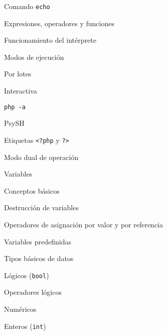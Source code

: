 \begin{longenum}
\begin{longenum}
\begin{longenum}
            \begin{longenum}
                \item Comando \texttt{echo}
            \end{longenum}
            \item Expresiones, operadores y funciones
        \end{longenum}
        \item Funcionamiento del intérprete
        \begin{longenum}
            \item Modos de ejecución
            \begin{longenum}
                \item Por lotes
                \item Interactiva
                \begin{longenum}
                    \item \texttt{php -a}
                    \item PsySH
                \end{longenum}
            \end{longenum}
            \item Etiquetas \texttt{<?php} y \texttt{?>}
            \item Modo dual de operación
        \end{longenum}
        \item Variables
        \begin{longenum}
            \item Conceptos básicos
            \item Destrucción de variables
            \item Operadores de asignación por valor y por referencia
            \item Variables predefinidas
        \end{longenum}
        \item Tipos básicos de datos
        \begin{longenum}
            \item Lógicos (\texttt{bool})
            \begin{longenum}
                \item Operadores lógicos
            \end{longenum}
            \item Numéricos
            \begin{longenum}
                \item Enteros (\texttt{int})

\end{longenum}
\end{longenum}
\end{longenum}
\end{longenum}
